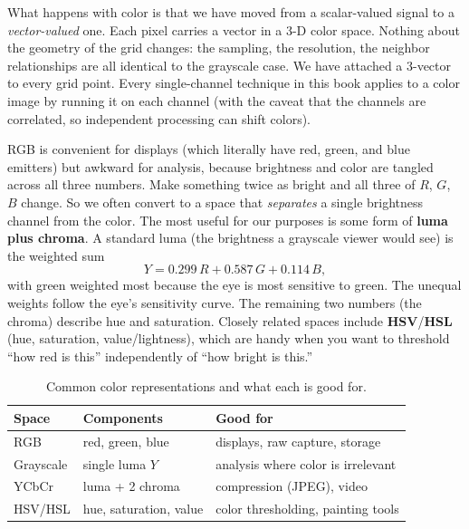 \begin{happeningbox}
What happens with color is that we have moved from a scalar-valued
signal to a \emph{vector-valued} one. Each pixel carries a vector in a
3-D color space. Nothing about the geometry of the grid changes: the
sampling, the resolution, the neighbor relationships are all identical to the
grayscale case. We have attached a 3-vector to every grid point. Every
single-channel technique in this book applies to a color image by running it on
each channel (with the caveat that the channels are correlated, so independent
processing can shift colors).
\end{happeningbox}

RGB is convenient for displays (which literally have red, green, and blue
emitters) but awkward for analysis, because brightness and color are tangled
across all three numbers. Make something twice as bright and all three of $R$,
$G$, $B$ change. So we often convert to a space that \emph{separates} a single
brightness channel from the color. The most useful for our purposes is some form
of \textbf{luma plus chroma}. A standard luma (the brightness a grayscale viewer
would see) is the weighted sum
\begin{equation}
\label{ch30:luma}
Y = 0.299\,R + 0.587\,G + 0.114\,B,
\end{equation}
with green weighted most because the eye is most sensitive to green. The unequal
weights follow the eye's sensitivity curve. The remaining two numbers (the chroma) describe hue and
saturation. Closely related spaces include \textbf{HSV}/\textbf{HSL} (hue,
saturation, value/lightness), which are handy when you want to threshold ``how
red is this'' independently of ``how bright is this.''

\begin{table}[H]
\centering
\caption{Common color representations and what each is good for.}
\label{ch30:tab-color}
\begin{tabular}{@{}lll@{}}
\toprule
Space & Components & Good for \\
\midrule
RGB & red, green, blue & displays, raw capture, storage \\
Grayscale & single luma $Y$ & analysis where color is irrelevant \\
YCbCr & luma + 2 chroma & compression (JPEG), video \\
HSV/HSL & hue, saturation, value & color thresholding, painting tools \\
\bottomrule
\end{tabular}
\end{table}

